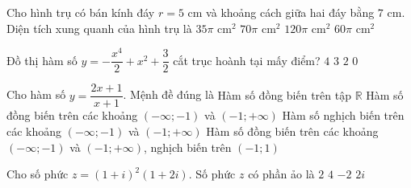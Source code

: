 \begin{ex}%
	Cho hình trụ có bán kính đáy $r = 5$ cm và khoảng cách giữa hai đáy bằng $7$ cm. Diện tích xung quanh của hình trụ là	
	\choice
	{$35\pi$ cm$^2$}
	{\True $70\pi$ cm$^2$}
	{$120\pi$ cm$^2$}
	{$60\pi$ cm$^2$}
\end{ex}

\begin{ex}%
	Đồ thị hàm số $y = -\dfrac{x^4}{2} + x^2 + \dfrac{3}{2}$ cắt trục hoành tại mấy điểm?	
	\choice
	{$4$}
	{$3$}
	{\True $2$}
	{$0$}
\end{ex}
\begin{ex}%
	Cho hàm số $ y=\dfrac{2x+1}{x+1} $. Mệnh đề đúng là
	\choice
	{Hàm số đồng biến trên tập $\mathbb{R}$}
	{\True Hàm số đồng biến trên các khoảng $ (-\infty;-1) $ và $ (-1;+\infty) $}
	{Hàm số nghịch biến trên các khoảng $ (-\infty;-1) $ và $ (-1;+\infty) $}
	{Hàm số đồng biến trên các khoảng $ (-\infty;-1) $ và $ (-1;+\infty) $, nghịch biến trên $ 
		(-1;1) $}
\end{ex}
\begin{ex}%
	Cho số phức $ z=(1+i)^2(1+2i). $ Số phức $ z $ có phần ảo là
	\choice
	{\True$ 2 $}
	{$ 4 $}
	{ $ -2 $}
	{$ 2i $}
\end{ex}
